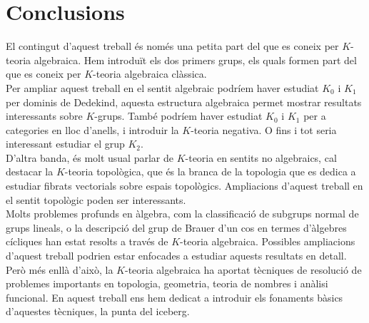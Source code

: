 

\chapter{Conclusions} 
El contingut d'aquest treball és només una petita part del que es coneix per $K$-teoria algebraica. Hem introduït els dos primers grups, els quals formen part del que es coneix per $K$-teoria algebraica clàssica. \\
\indent Per ampliar aquest treball en el sentit algebraic podríem haver estudiat $K_0$ i $K_1$ per dominis de Dedekind, aquesta estructura algebraica permet mostrar resultats interessants sobre $K$-grups. També podríem haver estudiat $K_0$ i $K_1$ per a categories en lloc d'anells, i introduir la $K$-teoria negativa. O fins i tot seria interessant estudiar el grup $K_2$. \\
\indent D'altra banda, és molt usual parlar de $K$-teoria en sentits no algebraics, cal destacar la $K$-teoria topològica, que és la branca de la topologia que es dedica a estudiar fibrats vectorials sobre espais topològics.  Ampliacions d'aquest treball en el sentit topològic poden ser interessants. \\
\indent Molts problemes profunds en àlgebra, com la classificació de subgrups normal de grups lineals, o la descripció del grup de Brauer d'un cos en termes d'àlgebres cícliques han estat resolts a través de $K$-teoria algebraica. Possibles ampliacions d'aquest treball podrien estar enfocades a estudiar aquests resultats en detall.\\
\indent Però més enllà d'això, la $K$-teoria algebraica ha aportat tècniques de resolució de problemes importants en topologia, geometria, teoria de nombres i anàlisi funcional.
En aquest treball ens hem dedicat a introduir els fonaments bàsics d'aquestes tècniques, la punta del iceberg.